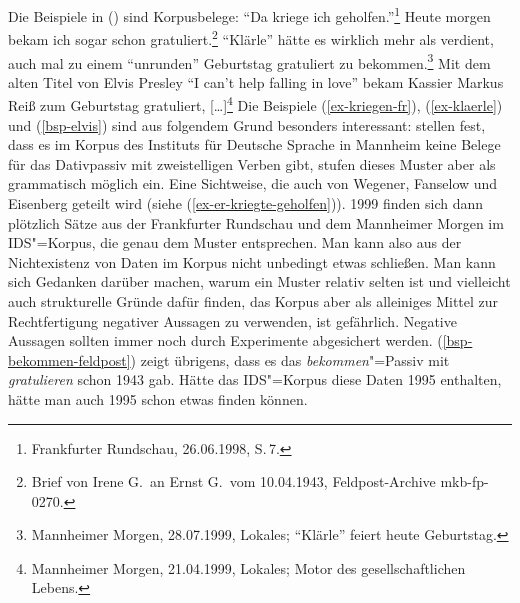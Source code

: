 \noindent
Die Beispiele in () sind Korpusbelege:
\eal
\ex\label{ex-kriegen-fr} "`Da kriege ich geholfen."'\footnote{
Frankfurter Rundschau, 26.06.1998, S.\,7.%
}
\ex\label{bsp-bekommen-feldpost}
Heute morgen bekam ich sogar schon gratuliert.\footnote{%
Brief von Irene G.\ an Ernst G.\ vom 10.04.1943, Feldpost-Archive mkb-fp-0270.}
\ex\label{ex-klaerle} 
"`Klärle"' hätte es wirklich mehr als verdient, auch mal zu einem "`unrunden"' Geburtstag gratuliert zu bekommen.\footnote{
Mannheimer Morgen, 28.07.1999, Lokales; "`Klärle"' feiert heute Geburtstag.%
}
\ex\label{bsp-elvis}
Mit dem alten Titel von Elvis Presley "`I can't help falling in love"' bekam Kassier Markus Reiß zum Geburtstag gratuliert, [\ldots]\footnote{
Mannheimer Morgen, 21.04.1999, Lokales; Motor des gesellschaftlichen Lebens.%
}
\zl
Die Beispiele (\ref{ex-kriegen-fr}), (\ref{ex-klaerle}) und (\ref{bsp-elvis}) 
sind aus folgendem Grund besonders interessant:\label{frequenz-von-korpusbelegen}
\citet{HW95a} stellen fest, dass es im Korpus des Instituts für Deutsche Sprache in Mannheim keine
Belege für das Dativpassiv mit zweistelligen Verben gibt, stufen dieses Muster aber als grammatisch
möglich ein. Eine Sichtweise, die auch von Wegener, Fanselow und Eisenberg geteilt wird (siehe (\ref{ex-er-kriegte-geholfen})).
1999 finden sich dann plötzlich Sätze aus der Frankfurter Rundschau und dem Mannheimer Morgen im IDS"=Korpus, die genau dem Muster 
entsprechen. Man kann also aus der Nichtexistenz von Daten im Korpus nicht unbedingt etwas schließen. Man kann sich
Gedanken darüber machen, warum ein Muster relativ selten ist und vielleicht auch strukturelle
Gründe dafür finden, das Korpus aber als alleiniges Mittel zur Rechtfertigung negativer
Aussagen zu verwenden, ist gefährlich. Negative Aussagen sollten immer noch durch Experimente abgesichert
werden. (\ref{bsp-bekommen-feldpost}) zeigt übrigens, dass es das \emph{bekommen}"=Passiv mit \emph{gratulieren} 
schon 1943 gab. Hätte das IDS"=Korpus diese Daten 1995 enthalten, hätte man auch 1995 schon etwas finden können.

